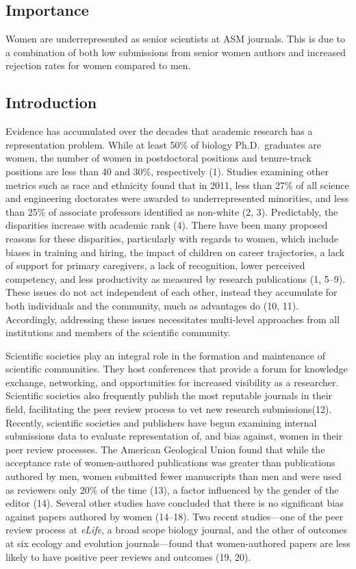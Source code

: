 \documentclass[11pt,]{article}
\begin{document}
\subsection{Importance}\label{importance}

Women are underrepresented as senior scientists at ASM journals. This is
due to a combination of both low submissions from senior women authors
and increased rejection rates for women compared to men.

\subsection{Introduction}\label{introduction}

Evidence has accumulated over the decades that academic research has a
representation problem. While at least 50\% of biology Ph.D.~graduates
are women, the number of women in postdoctoral positions and
tenure-track positions are less than 40 and 30\%, respectively (1).
Studies examining other metrics such as race and ethnicity found that in
2011, less than 27\% of all science and engineering doctorates were
awarded to underrepresented minorities, and less than 25\% of associate
professors identified as non-white (2, 3). Predictably, the disparities
increase with academic rank (4). There have been many proposed reasons
for these disparities, particularly with regards to women, which include
biases in training and hiring, the impact of children on career
trajectories, a lack of support for primary caregivers, a lack of
recognition, lower perceived competency, and less productivity as
measured by research publications (1, 5--9). These issues do not act
independent of each other, instead they accumulate for both individuals
and the community, much as advantages do (10, 11). Accordingly,
addressing these issues necessitates multi-level approaches from all
institutions and members of the scientific community.

Scientific societies play an integral role in the formation and
maintenance of scientific communities. They host conferences that
provide a forum for knowledge exchange, networking, and opportunities
for increased visibility as a researcher. Scientific societies also
frequently publish the most reputable journals in their field,
facilitating the peer review process to vet new research
submissions(12). Recently, scientific societies and publishers have
begun examining internal submissions data to evaluate representation of,
and bias against, women in their peer review processes. The American
Geological Union found that while the acceptance rate of women-authored
publications was greater than publications authored by men, women
submitted fewer manuscripts than men and were used as reviewers only
20\% of the time (13), a factor influenced by the gender of the editor
(14). Several other studies have concluded that there is no significant
bias against papers authored by women (14--18). Two recent studies---one
of the peer review process at \emph{eLife}, a broad scope biology
journal, and the other of outcomes at six ecology and evolution
journals---found that women-authored papers are less likely to have
positive peer reviews and outcomes (19, 20).
\end{document}
